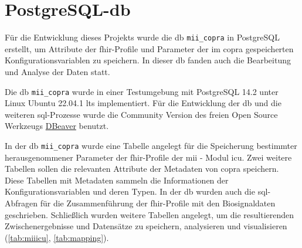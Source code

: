 \section{PostgreSQL-\acs{db}} \label{sec:database}

Für die Entwicklung dieses Projekts wurde die \ac{db} \texttt{mii\_copra} in PostgreSQL erstellt, um Attribute der \ac{fhir}-Profile und Parameter der im \ac{copra} gespeicherten Konfigurationsvariablen zu speichern. In dieser \ac{db} fanden auch die Bearbeitung und Analyse der Daten statt.

Die \ac{db} \texttt{mii\_copra} wurde in einer Testumgebung mit PostgreSQL 14.2 unter Linux Ubuntu 22.04.1 \ac{lts} implementiert. Für die Entwicklung der \ac{db} und die weiteren \ac{sql}-Prozesse wurde die Community Version des freien Open Source Werkzeugs \href{https://dbeaver.io/}{DBeaver} benutzt.

In der \ac{db} \texttt{mii\_copra} wurde eine Tabelle angelegt für die Speicherung bestimmter herausgenommener Parameter der \ac{fhir}-Profile der \ac{mii} - Modul \glqq\ac{icu}\grqq{}. Zwei weitere Tabellen sollen die relevanten Attribute der Metadaten von \ac{copra} speichern. Diese Tabellen mit Metadaten 
sammeln die Informationen der Konfigurationsvariablen und deren Typen. In der \ac{db} wurden auch die \ac{sql}-Abfragen für die Zusammenführung der \ac{fhir}-Profile mit den Biosignaldaten geschrieben. Schließlich wurden weitere Tabellen angelegt, um die resultierenden Zwischenergebnisse und Datensätze zu speichern, analysieren und visualisieren (\ref{tab:miiicu}, \ref{tab:mapping}).